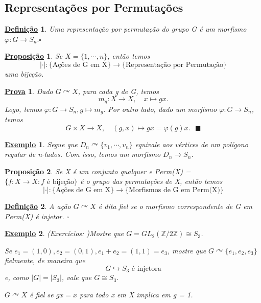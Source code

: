 \documentclass{article}
\newtheorem*{def*}{\underline{Defini\c c\~ao}}
\newtheorem*{prop*}{\underline{Proposi\c c\~ao}}
\newtheorem{example*}{\underline{Exemplo}}
\newtheorem*{proof*}{\underline{Prova}}
\renewcommand\qedsymbol{$\blacksquare$}
\begin{document}
\subsection{Representa\c cões por Permuta\c cões}
 \begin{def*}
   Uma representa\c cão por permuta\c cão do grupo G é um morfismo \(\varphi :G\rightarrow S_{n}. \square\)
 \end{def*}
\begin{prop*}
  Se \(X = \{1, \cdots, n\}\), então temos 
    \[
      |\cdot |:\biggl\{\text{A\c cões de G em X}\biggr\}\rightarrow \biggl\{\text{Representa\c cão por Permuta\c cão}\biggr\}
    \]
    uma bije\c cão.
\end{prop*}
\begin{proof*}
  Dado \(G \curvearrowright X\), para cada g de G, temos 
    \[
      m_{g}:X\rightarrow X,\quad x\mapsto gx.
    \]
  Logo, temos \(\varphi :G\rightarrow S_{n}, g\mapsto m_{g}.\) Por outro lado, dado um morfismo \(\varphi :G\rightarrow S_{n}\), temos 
    \[
      G\times{}X\rightarrow X,\quad (g, x)\mapsto gx = \varphi (g)x.\text{ \qedsymbol}
    \]
\end{proof*}
\begin{example*}
  Segue que \(D_{n}\curvearrowright \{v_{1}, \cdots, v_{n}\}\) equivale aos vértices de um polígono regular de n-lados. Com isso, temos um morfismo
  \(D_{n}\rightarrow S_{n}\).
\end{example*}
\begin{prop*}
  Se X é um conjunto qualquer e Perm(X) = \(\{f:X\rightarrow X: f \text{ é bije\c cão}\}\) é o grupo das permuta\c cões de X, então temos 
    \[
      |\cdot |:\biggl\{\text{A\c cões de G em X}\biggr\}\rightarrow\biggl\{\text{Morfismos de G em Perm(X)}\biggr\}
    \]
\end{prop*}
\begin{def*}
  A a\c cão \(G \curvearrowright X\) é dita fiel se o morfismo correspondente de G em Perm(X) é injetor. \(\square\)
\end{def*}
\begin{example*}
  (Exercícios: )Mostre que \(G = GL_{2}(\mathbb{Z}/2 \mathbb{Z})\cong{S_{3}}\).

  Se \(e_{1}=(1, 0), e_{2} = (0, 1), e_{1}+e_{2} = (1, 1) = e_{3}\), mostre que \(G \curvearrowright \{e_{1}, e_{2}, e_{3}\}\) fielmente, de maneira que 
    \[
      G\hookrightarrow S_{3}\text{ é injetora}
    \]
    e, como \(|G| = |S_{3}|\), vale que \(G\cong{S_{3}.}\)

    \(G \curvearrowright X\) é fiel se \(gx=x\) para todo x em X implica em g = 1.
\end{example*}
\newpage
\end{document}
